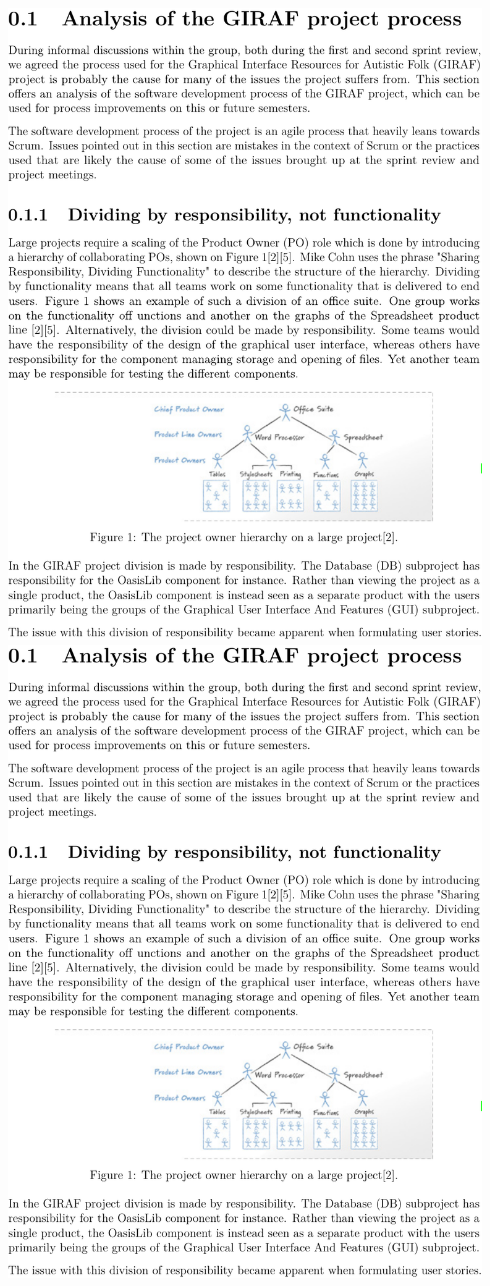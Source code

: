 \includegraphics[page=4,width=0.94\textwidth]{part_appendix/sw601f15.pdf}\clearpage{}
\includegraphics[page=5,width=0.94\textwidth]{part_appendix/sw601f15.pdf}\clearpage{}
